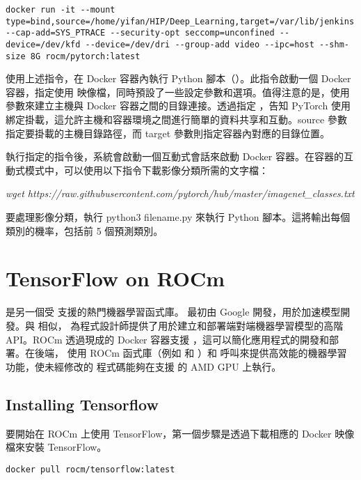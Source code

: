\begin{lstlisting}[numbers=none, caption={啟動Docker容器的指令}, captionpos=t, label={lst:cmd_docker_act_pyt}]
docker run -it --mount type=bind,source=/home/yifan/HIP/Deep_Learning,target=/var/lib/jenkins --cap-add=SYS_PTRACE --security-opt seccomp=unconfined --device=/dev/kfd --device=/dev/dri --group-add video --ipc=host --shm-size 8G rocm/pytorch:latest
\end{lstlisting}

使用上述指令，在 Docker 容器內執行 Python 腳本（）。此指令啟動一個 Docker 容器，指定使用  映像檔，同時預設了一些設定參數和選項。值得注意的是，使用  參數來建立主機與 Docker 容器之間的目錄連接。透過指定 ，告知 PyTorch 使用綁定掛載，這允許主機和容器環境之間進行簡單的資料共享和互動。source 參數指定要掛載的主機目錄路徑，而 target 參數則指定容器內對應的目錄位置。

執行指定的指令後，系統會啟動一個互動式會話來啟動 Docker 容器。在容器的互動式模式中，可以使用以下指令下載影像分類所需的文字檔：

\textit{wget https://raw.githubusercontent.com/pytorch/hub/master/imagenet\_classes.txt}

要處理影像分類，執行 python3 filename.py 來執行 Python 腳本。這將輸出每個類別的機率，包括前 5 個預測類別。

\section{TensorFlow on ROCm}

 是另一個受  支援的熱門機器學習函式庫。 最初由 Google 開發，用於加速模型開發。與  相似， 為程式設計師提供了用於建立和部署端對端機器學習模型的高階 API。ROCm 透過現成的 Docker 容器支援 ，這可以簡化應用程式的開發和部署。在後端， 使用 ROCm 函式庫（例如  和 ）和  呼叫來提供高效能的機器學習功能，使未經修改的  程式碼能夠在支援  的 AMD GPU 上執行。

\subsection{Installing Tensorflow}

要開始在 ROCm 上使用 TensorFlow，第一個步驟是透過下載相應的 Docker 映像檔來安裝 TensorFlow。

\begin{lstlisting}[numbers=none, caption={獲取最新Tensorflow映像檔的指令}, captionpos=t, label={lst:cmd_get_tsf_image}]
docker pull rocm/tensorflow:latest
\end{lstlisting}

